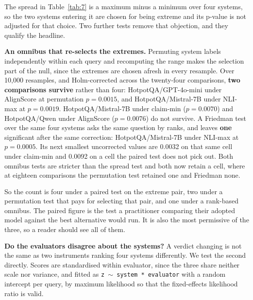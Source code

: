 \documentclass[11pt]{article}
\begin{document}
The spread in Table~\ref{tab:7} is a maximum minus a minimum over four systems, so the two systems entering it are chosen for being extreme and its p-value is not adjusted for that choice. Two further tests remove that objection, and they qualify the headline.

\textbf{An omnibus that re-selects the extremes.} Permuting system labels independently within each query and recomputing the range makes the selection part of the null, since the extremes are chosen afresh in every resample. Over 10,000 resamples, and Holm-corrected across the twenty-four comparisons, \textbf{two comparisons survive} rather than four: HotpotQA/GPT-4o-mini under AlignScore at permutation $p = 0.0015$, and HotpotQA/Mistral-7B under NLI-max at $p = 0.0019$. HotpotQA/Mistral-7B under claim-min ($p = 0.0070$) and HotpotQA/Qwen under AlignScore ($p = 0.0076$) do not survive. A Friedman test over the same four systems asks the same question by ranks, and leaves \textbf{one} significant after the same correction: HotpotQA/Mistral-7B under NLI-max at $p = 0.0005$. Its next smallest uncorrected values are 0.0032 on that same cell under claim-min and 0.0092 on a cell the paired test does not pick out. Both omnibus tests are stricter than the spread test and both now retain a cell, where at eighteen comparisons the permutation test retained one and Friedman none.

So the count is four under a paired test on the extreme pair, two under a permutation test that pays for selecting that pair, and one under a rank-based omnibus. The paired figure is the test a practitioner comparing their adopted model against the best alternative would run. It is also the most permissive of the three, so a reader should see all of them.

\textbf{Do the evaluators disagree about the systems?} A verdict changing is not the same as two instruments ranking four systems differently. We test the second directly. Scores are standardised within evaluator, since the three share neither scale nor variance, and fitted as \texttt{z $\sim$ system * evaluator} with a random intercept per query, by maximum likelihood so that the fixed-effects likelihood ratio is valid.
\end{document}
